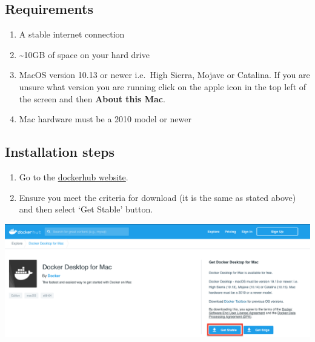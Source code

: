 \documentclass[
]{book}
\providecommand{\tightlist}{%
  \setlength{\itemsep}{0pt}\setlength{\parskip}{0pt}}
\begin{document}
\hypertarget{requirements}{%
\subsection*{Requirements}\label{requirements}}

\begin{enumerate}
\def\labelenumi{\arabic{enumi}.}
\tightlist
\item
  A stable internet connection
\item
  \textasciitilde10GB of space on your hard drive
\item
  MacOS version 10.13 or newer i.e.~High Sierra, Mojave or Catalina. If you are unsure what version you are running click on the apple icon in the top left of the screen and then \textbf{About this Mac}.
\item
  Mac hardware must be a 2010 model or newer
\end{enumerate}

\hypertarget{installation-steps}{%
\subsection*{Installation steps}\label{installation-steps}}

\begin{enumerate}
\def\labelenumi{\arabic{enumi}.}
\tightlist
\item
  Go to the \href{https://hub.docker.com/editions/community/docker-ce-desktop-mac/}{dockerhub website}.
\item
  Ensure you meet the criteria for download (it is the same as stated above) and then select `Get Stable' button.
\end{enumerate}

\begin{center}\includegraphics[width=18.33in]{figs/chp1/Figure1} \end{center}
\end{document}
